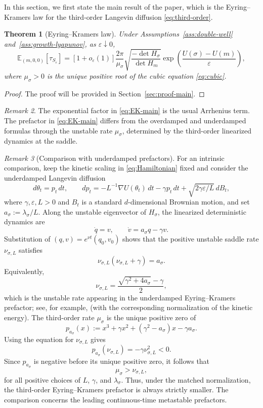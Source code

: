 \documentclass[11pt]{article}
\numberwithin{equation}{section}
\theoremstyle{plain}
\newtheorem{theorem}{Theorem}[section]
\theoremstyle{definition}
\theoremstyle{remark}
\newtheorem{remark}[theorem]{Remark}
\newcommand{\eps}{\varepsilon}
\newcommand{\E}{\mathbb E}
\begin{document}
In this section, we first state the main result of the paper,
which is the Eyring--Kramers law for the third-order Langevin diffusion \eqref{eq:third-order}.

\begin{theorem}[Eyring--Kramers law]
\label{thm:EK}
Under Assumptions~\ref{ass:double-well} and~\ref{ass:growth-lyapunov}, as
$\eps\downarrow0$,
\begin{equation}
\label{eq:EK-main}
\E_{(m,0,0)}[\tau_{S_\eps}]
=
[1+o_\eps(1)]
\frac{2\pi}{\mu_\sigma}
\sqrt{\frac{-\det H_\sigma}{\det H_m}}
\exp\!\left(\frac{U(\sigma)-U(m)}{\eps}\right),
\end{equation}
where $\mu_\sigma>0$ is the unique positive root of the cubic equation \eqref{eq:cubic}.
\end{theorem}

\begin{proof}
The proof will be provided in Section~\ref{sec:proof-main}.
\end{proof}

\begin{remark}
The exponential factor in \eqref{eq:EK-main} is the usual Arrhenius term.
The prefactor in \eqref{eq:EK-main} differs from
the overdamped and underdamped formulas through the unstable rate $\mu_\sigma$,
determined by the third-order linearized dynamics at the saddle.
\end{remark}

\begin{remark}[Comparison with underdamped prefactors]
\label{rem:prefactor-comparison}
For an intrinsic comparison, keep the kinetic scaling in
\eqref{eq:Hamiltonian} fixed and consider the underdamped Langevin diffusion
\[
d\theta_t=p_t\,dt,
\qquad
dp_t=-L^{-1}\nabla U(\theta_t)\,dt-\gamma p_t\,dt
      +\sqrt{2\gamma\eps/L}\,dB_t,
\]
where $\gamma,\eps,L>0$ and $B_{t}$ is a standard $d$-dimensional Brownian motion, 
and set $a_\sigma:=\lambda_\sigma/L$.  Along the unstable eigenvector of
$H_\sigma$, the linearized deterministic dynamics are
\[
    \dot q=v,
    \qquad
    \dot v=a_\sigma q-\gamma v.
\]
Substitution of $(q,v)=e^{\nu t}(q_0,v_0)$ shows that the positive unstable
saddle rate $\nu_{\sigma,L}$ satisfies
\[
\nu_{\sigma,L}(\nu_{\sigma,L}+\gamma)=a_\sigma.
\]
Equivalently,
\[
    \nu_{\sigma,L}
    =\frac{\sqrt{\gamma^2+4a_\sigma}-\gamma}{2},
\]
which is the unstable rate appearing in the underdamped Eyring--Kramers
prefactor; see, for example, \cite[Theorem~2.6]{LeeRamilSeo2026} (with the
corresponding normalization of the kinetic energy).
The third-order rate $\mu_\sigma$ is the unique positive zero of
\[
p_{a_\sigma}(x)
:=x^3+\gamma x^2+(\gamma^2-a_\sigma)x-\gamma a_\sigma.
\]
Using the equation for $\nu_{\sigma,L}$ gives
\[
p_{a_\sigma}(\nu_{\sigma,L})=-\gamma\nu_{\sigma,L}^2<0.
\]
Since $p_{a_\sigma}$ is negative before its unique positive zero, it follows
that
\[
\mu_\sigma>\nu_{\sigma,L},
\]
for all positive choices of $L$, $\gamma$, and $\lambda_\sigma$.  Thus, under
the matched normalization,
the third-order Eyring--Kramers prefactor is always strictly smaller.  The
comparison concerns the leading continuous-time metastable prefactors.
\end{remark}
\end{document}
